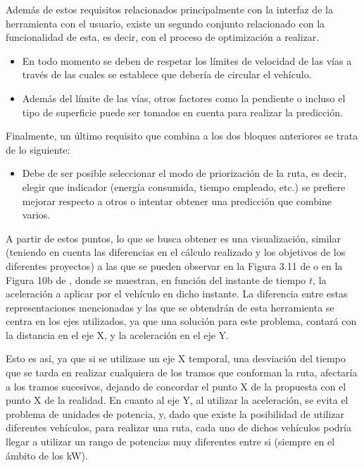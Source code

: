 \documentclass[11pt,spanish,listoffigures,listoftables]{tfgetsinf}
\begin{document}
Además de estos requisitos relacionados principalmente con la interfaz de la herramienta con el usuario, existe un segundo conjunto relacionado con la funcionalidad de esta, es decir, con el proceso de optimización a realizar.

\begin{itemize}
    \item En todo momento se deben de respetar los límites de velocidad de las vías a través de las cuales se establece que debería de circular el vehículo.
    \item Además del límite de las vías, otros factores como la pendiente o incluso el tipo de superficie puede ser tomados en cuenta para realizar la predicción.
\end{itemize}

Finalmente, un último requisito que combina a los dos bloques anteriores se trata de lo siguiente:

\begin{itemize}
    \item Debe de ser posible seleccionar el modo de priorización de la ruta, es decir, elegir que indicador (energía consumida, tiempo empleado, etc.) se prefiere mejorar respecto a otros o intentar obtener una predicción que combine varios.
\end{itemize}

A partir de estos puntos, lo que se busca obtener es una visualización, similar (teniendo en cuenta las diferencias en el cálculo realizado y los objetivos de los diferentes proyectos) a las que se pueden observar en la Figura 3.11 de \cite{Bader13} o en la Figura 10b de \cite{EVS26}, donde se muestran, en función del instante de tiempo $t$, la aceleración a aplicar por el vehículo en dicho instante. La diferencia entre estas representaciones mencionadas y las que se obtendrán de esta herramienta se centra en los ejes utilizados, ya que una solución para este problema, contará con la distancia en el eje X, y la aceleración en el eje Y.

Esto es así, ya que si se utilizase un eje X temporal, una desviación del tiempo que se tarda en realizar cualquiera de los tramos que conforman la ruta, afectaría a los tramos sucesivos, dejando de concordar el punto X de la propuesta con el punto X de la realidad. En cuanto al eje Y, al utilizar la aceleración, se evita el problema de unidades de potencia, y, dado que existe la posibilidad de utilizar diferentes vehículos, para realizar una ruta, cada uno de dichos vehículos podría llegar a utilizar un rango de potencias muy diferentes entre si (siempre en el ámbito de los kW).
\end{document}
